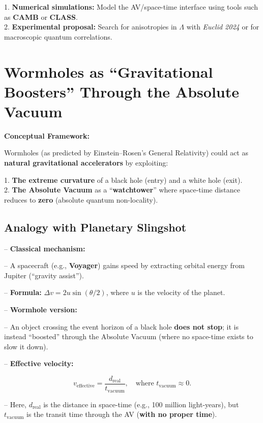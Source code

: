 \documentclass[a4paper]{article}
\theoremstyle{definition}
\theoremstyle{remark}
\numberwithin{equation}{section}
\begin{document}
1. \textbf{Numerical simulations:} Model the AV/space-time interface using tools such as \textbf{CAMB} or \textbf{CLASS}.\\

2. \textbf{Experimental proposal:} Search for anisotropies in \(\Lambda\) with \textit{Euclid 2024} or for macroscopic quantum correlations.

\section{Wormholes as ``Gravitational Boosters'' Through the Absolute Vacuum}

\textbf{Conceptual Framework:}

Wormholes (as predicted by Einstein–Rosen's General Relativity) could act as \textbf{natural gravitational accelerators} by exploiting:

1. \textbf{The extreme curvature} of a black hole (entry) and a white hole (exit).\\

2. \textbf{The Absolute Vacuum} as a ``\textbf{watchtower}'' where space-time distance reduces to \textbf{zero} (absolute quantum non-locality).

\subsection{Analogy with Planetary Slingshot}

– \textbf{Classical mechanism:}

– A spacecraft (e.g., \textbf{Voyager}) gains speed by extracting orbital energy from Jupiter (``gravity assist'').

– \textbf{Formula:} \( \Delta v = 2u \sin(\theta/2) \), where \( u \) is the velocity of the planet.

– \textbf{Wormhole version:}

– An object crossing the event horizon of a black hole \textbf{does not stop}; it is instead ``boosted'' through the Absolute Vacuum (where no space-time exists to slow it down).

– \textbf{Effective velocity:}

\[
v_{\text{effective}} = \frac{d_{\text{real}}}{t_{\text{vacuum}}}, \quad \text{where } t_{\text{vacuum}} \approx 0.
\]

– Here, \( d_{\text{real}} \) is the distance in space-time (e.g., 100 million light-years), but \( t_{\text{vacuum}} \) is the transit time through the AV (\textbf{with no proper time}).
\end{document}
